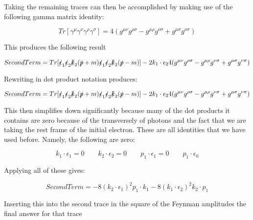 \documentclass[a4]{article}
\begin{document}
    Taking the remaining traces can then be accomplished by making use of the following gamma matrix identity:

    \begin{equation}
        Tr [\gamma^\mu \gamma^\nu \gamma^\rho \gamma^\sigma] = 4 (g^{\mu \nu} g^{\rho \sigma} - g^{\mu \rho} g^{\nu \sigma} + g^{\mu \sigma} g^{\nu \sigma})
    \end{equation}

    This produces the following result

    \begin{equation}
        Second Term = Tr [\slashed{\epsilon}_1 \slashed{\epsilon}_2 \slashed{k}_2 (\slashed{p} + m) \slashed{\epsilon}_1 \slashed{\epsilon}_2 \slashed{k}_2 (\slashed{p} - m)] - 2 k_1 \cdot \epsilon_2 4 (g^{\mu \nu} g^{\rho \sigma} - g^{\mu \rho} g^{\nu \sigma} + g^{\mu \sigma} g^{\nu \sigma})
    \end{equation}

    Rewriting in dot product notation produces:

    \begin{equation}
        Second Term = Tr [\slashed{\epsilon}_1 \slashed{\epsilon}_2 \slashed{k}_2 (\slashed{p} + m) \slashed{\epsilon}_1 \slashed{\epsilon}_2 \slashed{k}_2 (\slashed{p} - m)] - 2 k_1 \cdot \epsilon_2 4 (g^{\mu \nu} g^{\rho \sigma} - g^{\mu \rho} g^{\nu \sigma} + g^{\mu \sigma} g^{\nu \sigma})
    \end{equation}

    This then simplifies down significantly because many of the dot products it contains are zero because of the transversely of photons and the fact that we are taking the rest frame of the initial electron. These are all identities that we have used before. Namely, the following are zero:

    \begin{equation}
        k_1 \cdot \epsilon_1 = 0 \qquad k_2 \cdot \epsilon_2 = 0 \qquad p_1 \cdot \epsilon_1 = 0 \qquad p_1 \cdot \epsilon_0
    \end{equation}

    Applying all of these gives:

    \begin{equation}
        Second Term = - 8 (k_2 \cdot \epsilon_1)^2 p_1 \cdot k_1 - 8 (k_1 \cdot \epsilon_2)^2 k_2 \cdot p_1
    \end{equation}

    Inserting this into the second trace in the square of the Feynman amplitudes the final answer for that trace
\end{document}
